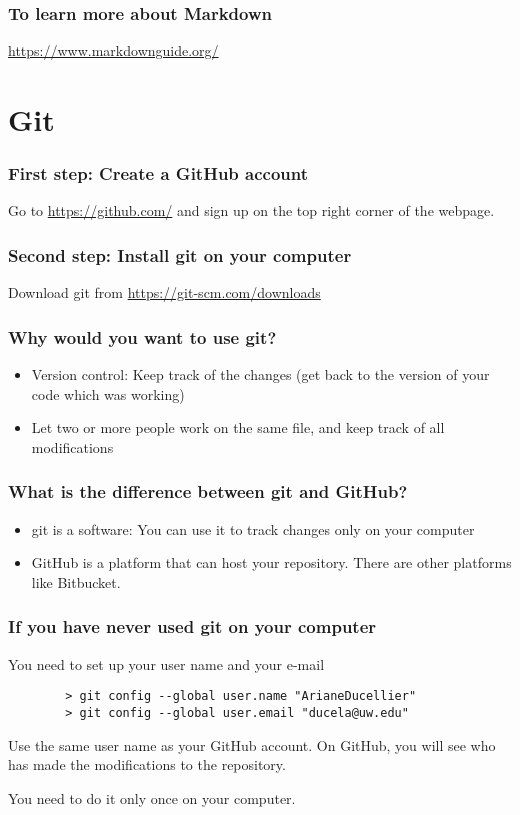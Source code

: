 \documentclass{beamer}
\begin{document}
	\begin{frame}
	\frametitle{To learn more about Markdown}
        	\href{https://www.markdownguide.org/}{https://www.markdownguide.org/}
	\end{frame}

	\section*{Git}

	\begin{frame}
	\frametitle{First step: Create a GitHub account}
	Go to \href{https://github.com/}{https://github.com/} and sign up on the top right corner of the webpage.
	\end{frame}

	\begin{frame}
	\frametitle{Second step: Install git on your computer}
	Download git from \href{https://git-scm.com/downloads}{https://git-scm.com/downloads}
	\end{frame}

	\begin{frame}
	\frametitle{Why would you want to use git?}
	\begin{itemize}
	\setlength\itemsep{1em}
		\item Version control: Keep track of the changes (get back to the version of your code which was working)
		\item Let two or more people work on the same file, and keep track of all modifications
	\end{itemize}
	\end{frame}

	\begin{frame}
	\frametitle{What is the difference between git and GitHub?}
	\begin{itemize}
	\setlength\itemsep{1em}
		\item git is a software: You can use it to track changes only on your computer
		\item GitHub is a platform that can host your repository. There are other platforms like Bitbucket.
	\end{itemize}
	\end{frame}

	\begin{frame}[fragile]
	\frametitle{If you have never used git on your computer}
	You need to set up your user name and your e-mail
	\begin{exampleblock}{}
		\begin{verbatim}
		> git config --global user.name "ArianeDucellier"
		> git config --global user.email "ducela@uw.edu"
			\end{verbatim}
	\end{exampleblock}
	Use the same user name as your GitHub account. On GitHub, you will see who has made the modifications to the repository.

	You need to do it only once on your computer.
	\end{frame}
\end{document}
